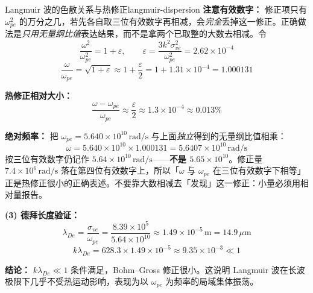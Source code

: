 \begin{example}{Langmuir 波的色散关系与热修正}{langmuir-dispersion}
\textbf{注意有效数字：} 修正项只有 $\omega_{pe}^2$ 的万分之几，若先各自取三位有效数字再相减，会\emph{完全}丢掉这一修正。正确做法是\emph{只用无量纲比值}表达结果，而不是拿两个已取整的大数去相减。令
\[
\frac{\omega^2}{\omega_{pe}^2} = 1 + \varepsilon, \qquad \varepsilon = \frac{3k^2\sigma_{ve}^2}{\omega_{pe}^2} = 2.62\times 10^{-4}
\]
\[
\frac{\omega}{\omega_{pe}} = \sqrt{1+\varepsilon} \approx 1 + \frac{\varepsilon}{2} = 1 + 1.31\times 10^{-4} = 1.000131
\]

\textbf{热修正相对大小：}
\[
\frac{\omega - \omega_{pe}}{\omega_{pe}} \approx \frac{\varepsilon}{2} \approx 1.3\times 10^{-4} \approx 0.013\%
\]

\textbf{绝对频率：} 把 $\omega_{pe}=5.640\times 10^{10}\,\mathrm{rad/s}$ 与上面\emph{独立}得到的无量纲比值相乘：
\[
\omega = 5.640\times 10^{10}\times 1.000131 = 5.6407\times 10^{10}\,\mathrm{rad/s}
\]
按三位有效数字仍记作 $\boxed{5.64\times 10^{10}\,\mathrm{rad/s}}$——\textbf{不是 $5.65\times 10^{10}$}。修正量 $7.4\times10^6\,\mathrm{rad/s}$ 落在第四位有效数字上，所以「$\omega$ 与 $\omega_{pe}$ 在三位有效数字下相等」正是热修正很小的正确表述。不要靠大数相减去「发现」这一修正：小量必须用相对量报告。

\textbf{(3) 德拜长度验证：}
\[
\lambda_{De} = \frac{\sigma_{ve}}{\omega_{pe}} = \frac{8.39\times 10^5}{5.64\times 10^{10}} \approx 1.49\times 10^{-5}\,\mathrm{m} = 14.9\,\mu\mathrm{m}
\]
\[
k\lambda_{De} = 628.3\times 1.49\times 10^{-5} \approx 9.35\times 10^{-3} \ll 1
\]

\textbf{结论：} $k\lambda_{De}\ll 1$ 条件满足，Bohm--Gross 修正很小。这说明 Langmuir 波在长波极限下几乎不受热运动影响，表现为以 $\omega_{pe}$ 为频率的局域集体振荡。
\end{example}

